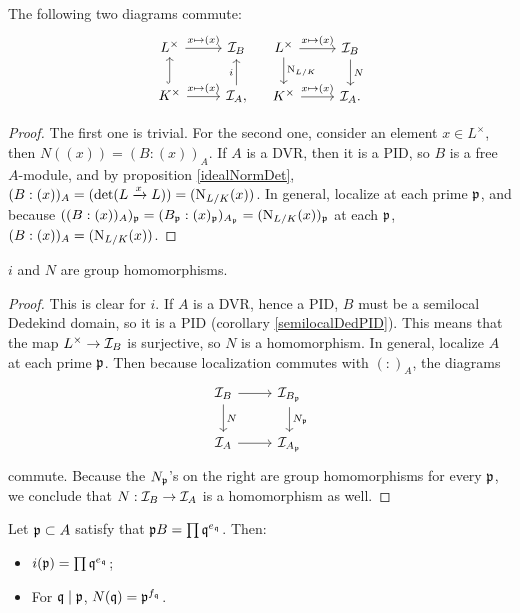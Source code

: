 \documentclass[11pt]{amsart}
\begin{document}
\begin{prop}
The following two diagrams commute:
\[
\begin{tikzcd}
L^{\times} \arrow[r, "x \mapsto (x)"] & \cI_B \\
K^{\times} \arrow[u, hook] \arrow[r, "x\mapsto (x)"] & \cI_A, \arrow[u, "i"]
\end{tikzcd}
\quad
\begin{tikzcd}
L^{\times} \arrow[r, "x \mapsto (x)"] \arrow[d, "\N_{L/K}"] & \cI_B \arrow[d, "N"] \\
K^{\times} \arrow[r, "x\mapsto (x)"] & \cI_A.
\end{tikzcd}
\]
\end{prop}

\begin{proof}
The first one is trivial. For the second one, consider an element $x\in L^{\times}$, then $N((x)) = (B : (x))_A$. If $A$ is a DVR, then it is a PID, so $B$ is a free $A$-module, and by proposition \ref{idealNormDet}, $(B:(x))_A = (\det(L\xrightarrow{x} L)) = (\operatorname{N}_{L/K}(x))$. In general, localize at each prime $\mathfrak{p}$, and because $((B: (x))_A)_{\mathfrak{p}} = (B_{\mathfrak{p}}: (x)_{\mathfrak{p}})_{A_{\mathfrak{p}}} = (\operatorname{N}_{L/K}(x))_{\mathfrak{p}}$ at each $\mathfrak{p}$, $(B:(x))_A = (\operatorname{N}_{L/K}(x))$.
\end{proof}

\begin{prop}
$i$ and $N$ are group homomorphisms.
\end{prop}

\begin{proof}
This is clear for $i$. If $A$ is a DVR, hence a PID, $B$ must be a semilocal Dedekind domain, so it is a PID (corollary \ref{semilocalDedPID}). This means that the map $L^{\times} \to \mathcal{I}_B$ is surjective, so $N$ is a homomorphism. In general, localize $A$ at each prime $\mathfrak{p}$. Then because localization commutes with $(:)_A$, the diagrams
\[
\begin{tikzcd}
\cI_B \arrow[r] \arrow[d, "N"] & \cI_{B_{\fp}} \arrow[d, "N_{\fp}"] \\
\cI_A \arrow[r] & \cI_{A_{\fp}}
\end{tikzcd}
\]
commute. Because the $N_{\mathfrak{p}}$'s on the right are group homomorphisms for every $\mathfrak{p}$, we conclude that $N: \mathcal{I}_B \to \mathcal{I}_A$ is a homomorphism as well.
\end{proof}

\begin{prop}
Let $\mathfrak{p}\subset A$ satisfy that $\mathfrak{p} B = \prod \mathfrak{q}^{e_{\mathfrak{q}}}$. Then:
\begin{itemize}
    \item $i(\mathfrak{p}) = \prod \mathfrak{q}^{e_{\mathfrak{q}}}$;
    \item For $\mathfrak{q}\mid \mathfrak{p}$, $N(\mathfrak{q}) = \mathfrak{p}^{f_{\mathfrak{q}}}$.
\end{itemize}
\end{prop}
\end{document}
